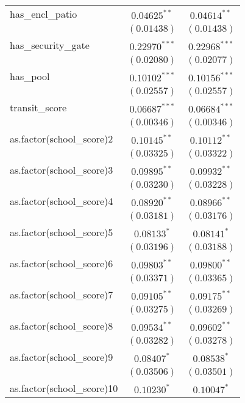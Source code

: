 \begin{table}
\begin{center}
\begin{tabular}{l c c}
has\_encl\_patio           & $0.04625^{**}$   & $0.04614^{**}$   \\
                           & $(0.01438)$      & $(0.01438)$      \\
has\_security\_gate        & $0.22970^{***}$  & $0.22968^{***}$  \\
                           & $(0.02080)$      & $(0.02077)$      \\
has\_pool                  & $0.10102^{***}$  & $0.10156^{***}$  \\
                           & $(0.02557)$      & $(0.02557)$      \\
transit\_score             & $0.06687^{***}$  & $0.06684^{***}$  \\
                           & $(0.00346)$      & $(0.00346)$      \\
as.factor(school\_score)2  & $0.10145^{**}$   & $0.10112^{**}$   \\
                           & $(0.03325)$      & $(0.03322)$      \\
as.factor(school\_score)3  & $0.09895^{**}$   & $0.09932^{**}$   \\
                           & $(0.03230)$      & $(0.03228)$      \\
as.factor(school\_score)4  & $0.08920^{**}$   & $0.08966^{**}$   \\
                           & $(0.03181)$      & $(0.03176)$      \\
as.factor(school\_score)5  & $0.08133^{*}$    & $0.08141^{*}$    \\
                           & $(0.03196)$      & $(0.03188)$      \\
as.factor(school\_score)6  & $0.09803^{**}$   & $0.09800^{**}$   \\
                           & $(0.03371)$      & $(0.03365)$      \\
as.factor(school\_score)7  & $0.09105^{**}$   & $0.09175^{**}$   \\
                           & $(0.03275)$      & $(0.03269)$      \\
as.factor(school\_score)8  & $0.09534^{**}$   & $0.09602^{**}$   \\
                           & $(0.03282)$      & $(0.03278)$      \\
as.factor(school\_score)9  & $0.08407^{*}$    & $0.08538^{*}$    \\
                           & $(0.03506)$      & $(0.03501)$      \\
as.factor(school\_score)10 & $0.10230^{*}$    & $0.10047^{*}$    \\

\end{tabular}
\end{center}
\end{table}
